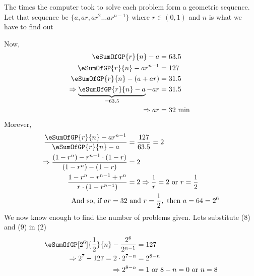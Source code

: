 \begin{solution}
	The times the computer took to solve each problem form a geometric sequence. Let 
	that sequence be $\lbrace a, ar, ar^2 \ldots ar^{n-1}\rbrace$ where $r \in (0,1)$ and $n$
	is what we have to find out
	
	Now,
	\begin{align}
		\eSumOfGP{r}{n} - a &= 63.5 \\
		\eSumOfGP{r}{n} - ar^{n-1} &= 127 \\
		\eSumOfGP{r}{n} - (a + ar) &= 31.5 \\
		\Rightarrow \underbrace{\eSumOfGP{r}{n} - a}_{=63.5} - ar &= 31.5 \\
		\Rightarrow ar &= 32\text{ min }
	\end{align}
	Morever, 
	\begin{align}
		\dfrac{\eSumOfGP{r}{n} - ar^{n-1}}{\eSumOfGP{r}{n} - a} &= \frac{127}{63.5} = 2 \\
		\Rightarrow \dfrac{(1-r^n) - r^{n-1}\cdot(1-r)}{(1-r^n) - (1-r)} &= 2  \\
		\dfrac{1-r^n-r^{n-1}+r^n}{r\cdot(1-r^{n-1})} &= 2 \Rightarrow \dfrac{1}{r} = 2 
		\text{ or } r = \frac{1}{2} \\
		\text{And so, if } ar = 32 &\text{ and } r = \frac{1}{2}, \text{ then } a = 64 = 2^6
	\end{align}
	We now know enough to find the number of problems given. Lets substitute (8) and (9) in (2)
	\begin{align}
		\eSumOfGP[2^6]{\frac{1}{2}}{n}-\dfrac{2^6}{2^{n-1}} &= 127 \\
		\Rightarrow 2^7-127 = 2\cdot 2^{7-n} &= 2^{8-n} \\
		\Rightarrow 2^{8-n} &= 1 \text{ or } 8-n = 0 \text{ or } n = 8
	\end{align}
\end{solution}
